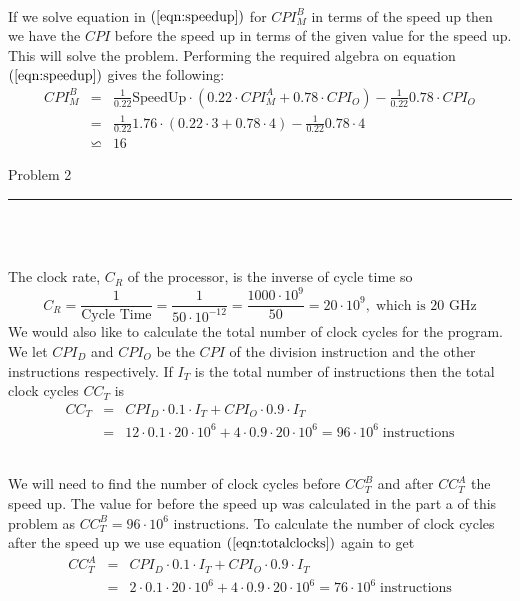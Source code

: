 \documentclass[11pt,reqno]{article}
\begin{document}
\newpage
\noindent{}\\ 

If we solve equation in $(\ref{eqn:speedup})$ for $CPI^B_M$ in terms of the speed up then we have the $CPI$ before the speed up in terms of the given value for the speed up. This will solve the problem. Performing the required algebra on equation $(\ref{eqn:speedup})$ gives the following:
\begin{eqnarray*}
CPI^B_M &=& \frac{1}{0.22} \text{SpeedUp} \cdot (0.22 \cdot CPI^A_M + 0.78 \cdot CPI_O) - \frac{1}{0.22} 0.78 \cdot CPI_O \\
		&=& \frac{1}{0.22} \text{1.76} \cdot (0.22 \cdot 3 + 0.78 \cdot 4) - \frac{1}{0.22} 0.78 \cdot 4\\
		&\backsimeq& 16
\end{eqnarray*}



\begin{flushleft} 
Problem 2 \\
\rule{500pt}{1pt}\\
\end{flushleft} 
\\ 

The clock rate, $C_R$ of the processor, is the inverse of cycle time so 
\[ C_R = \frac{1}{\text{Cycle Time}} = \frac{1}{50 \cdot 10^{-12}} = \frac{1000 \cdot 10^9}{50} = 20 \cdot 10^9, \; \text{which is  20 GHz}\]
We would also like to calculate the total number of clock cycles for the program. We let $CPI_D$ and $CPI_O$ be the $CPI$ of the division instruction and the other instructions respectively. If $I_T$ is the total number of instructions then the total clock cycles $CC_T$ is 
\begin{eqnarray} 
CC_T &=& CPI_D \cdot 0.1 \cdot I_T +  CPI_O \cdot 0.9 \cdot I_T  \label{eqn:totalclocks} \\
	   &=& 12 \cdot 0.1 \cdot 20 \cdot 10^6 + 4 \cdot 0.9 \cdot 20 \cdot 10^6 = 96 \cdot 10^6 \; \text{instructions} \nonumber
\end{eqnarray}

\noindent {}\\ 

We will need to find the number of clock cycles before $CC_T^B$ and after $CC_T^A$ the speed up. The value for before the speed up was calculated in the part a of this problem as $CC_T^B = 96 \cdot 10^6$ instructions. To calculate the number of clock cycles after the speed up we use equation $(\ref{eqn:totalclocks})$ again to get
\begin{eqnarray*} 
CC_T^A &=& CPI_D \cdot 0.1 \cdot I_T +  CPI_O \cdot 0.9 \cdot I_T  \\
	   &=& 2 \cdot 0.1 \cdot 20 \cdot 10^6 + 4 \cdot 0.9 \cdot 20 \cdot 10^6 = 76 \cdot 10^6 \; \text{instructions}
\end{eqnarray*}
\end{document}
